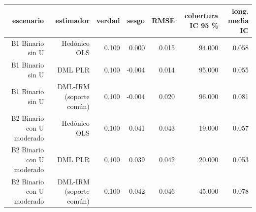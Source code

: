 \begin{tabular}{rrrrrrr}
\toprule
escenario & estimador & verdad & sesgo & RMSE & cobertura IC 95 \% & long. media IC \\
\midrule
B1 Binario sin U & Hedónico OLS & 0.100 & 0.000 & 0.015 & 94.000 & 0.058 \\
B1 Binario sin U & DML PLR & 0.100 & -0.004 & 0.014 & 95.000 & 0.055 \\
B1 Binario sin U & DML-IRM (soporte común) & 0.100 & -0.004 & 0.020 & 96.000 & 0.081 \\
B2 Binario con U moderado & Hedónico OLS & 0.100 & 0.041 & 0.043 & 19.000 & 0.057 \\
B2 Binario con U moderado & DML PLR & 0.100 & 0.039 & 0.042 & 20.000 & 0.053 \\
B2 Binario con U moderado & DML-IRM (soporte común) & 0.100 & 0.042 & 0.046 & 45.000 & 0.078 \\
\bottomrule
\end{tabular}